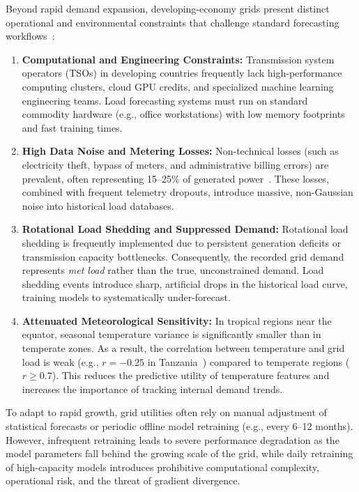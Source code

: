 \documentclass[11pt,letterpaper]{article}
\begin{document}
Beyond rapid demand expansion, developing-economy grids present distinct operational and environmental constraints that challenge standard forecasting workflows~\cite{mvungi2021load}:
\begin{enumerate}
    \item \textbf{Computational and Engineering Constraints:} Transmission system operators (TSOs) in developing countries frequently lack high-performance computing clusters, cloud GPU credits, and specialized machine learning engineering teams. Load forecasting systems must run on standard commodity hardware (e.g., office workstations) with low memory footprints and fast training times.
    \item \textbf{High Data Noise and Metering Losses:} Non-technical losses (such as electricity theft, bypass of meters, and administrative billing errors) are prevalent, often representing 15--25\% of generated power~\cite{daut2017building}. These losses, combined with frequent telemetry dropouts, introduce massive, non-Gaussian noise into historical load databases.
    \item \textbf{Rotational Load Shedding and Suppressed Demand:} Rotational load shedding is frequently implemented due to persistent generation deficits or transmission capacity bottlenecks. Consequently, the recorded grid demand represents \emph{met load} rather than the true, unconstrained demand. Load shedding events introduce sharp, artificial drops in the historical load curve, training models to systematically under-forecast.
    \item \textbf{Attenuated Meteorological Sensitivity:} In tropical regions near the equator, seasonal temperature variance is significantly smaller than in temperate zones. As a result, the correlation between temperature and grid load is weak (e.g., $r = -0.25$ in Tanzania~\cite{mvungi2021load}) compared to temperate regions ($r \ge 0.7$). This reduces the predictive utility of temperature features and increases the importance of tracking internal demand trends.
\end{enumerate}

To adapt to rapid growth, grid utilities often rely on manual adjustment of statistical forecasts or periodic offline model retraining (e.g., every 6--12 months). However, infrequent retraining leads to severe performance degradation as the model parameters fall behind the growing scale of the grid, while daily retraining of high-capacity models introduces prohibitive computational complexity, operational risk, and the threat of gradient divergence.
\end{document}
